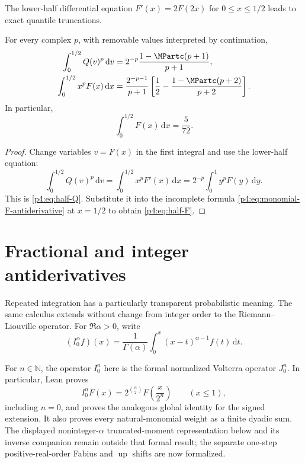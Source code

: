 \documentclass[11pt,oneside]{article}
\theoremstyle{definition}
\theoremstyle{remark}
\newcommand{\F}{F}
\newcommand{\Up}{\operatorname{up}}
\newcommand{\Q}{Q}
\newcommand{\N}{\mathbb N}
\newcommand{\dd}{\,\mathrm d}
\newcommand{\1}{\mathbf 1}
\begin{document}
The lower-half differential equation \(\F'(x)=2\F(2x)\) for \(0\le x\le1/2\)
leads to exact quantile truncations.

\begin{proposition}\label{p4:prop:half-identities}
For every complex \(p\), with removable values interpreted by continuation,
\begin{align}
 \int_0^{1/2}\Q(v)^p\dd v
 &=2^{-p}\frac{1-\MPartc(p+1)}{p+1},
 \label{p4:eq:half-Q}\\
 \int_0^{1/2}x^p\F(x)\dd x
 &=\frac{2^{-p-1}}{p+1}
 \left[\frac12-\frac{1-\MPartc(p+2)}{p+2}\right].
 \label{p4:eq:half-F}
\end{align}
In particular,
\begin{equation}\label{p4:eq:half-F-zero}
 \int_0^{1/2}\F(x)\dd x=\frac5{72}.
\end{equation}
\end{proposition}

\begin{proof}
Change variables \(v=\F(x)\) in the first integral and use the lower-half equation:
\[
 \int_0^{1/2}\Q(v)^p\dd v
 =\int_0^{1/2}x^p\F'(x)\dd x
 =2^{-p}\int_0^1y^p\F(y)\dd y.
\]
This is \cref{p4:eq:half-Q}.  Substitute it into the incomplete formula
\cref{p4:eq:monomial-F-antiderivative} at \(x=1/2\) to obtain \cref{p4:eq:half-F}.
\end{proof}

\section{Fractional and integer antiderivatives}

Repeated integration has a particularly transparent probabilistic meaning.  The same
calculus extends without change from integer order to the Riemann--Liouville operator.
For \(\Re\alpha>0\), write
\begin{equation}\label{p4:eq:RLdef}
 (I_0^\alpha f)(x)
 =\frac1{\Gamma(\alpha)}\int_0^x(x-t)^{\alpha-1}f(t)\dd t.
\end{equation}

\begin{statusbox}
For \(n\in\N\), the operator \(I_0^n\) here is the formal normalized Volterra operator
\(J_0^n\).  In particular, Lean proves
\[
 I_0^n\F(x)=2^{\binom n2}\F\!\left(\frac{x}{2^n}\right)
 \qquad(x\le1),
\]
including \(n=0\), and proves the analogous global identity for the signed extension.
It also proves every natural-monomial weight as a finite dyadic sum.  The displayed
noninteger-\(\alpha\) truncated-moment representation below and its inverse companion
remain outside that formal result; the separate one-step positive-real-order Fabius and \(\Up\)
shifts are now formalized.
\end{statusbox}
\end{document}
